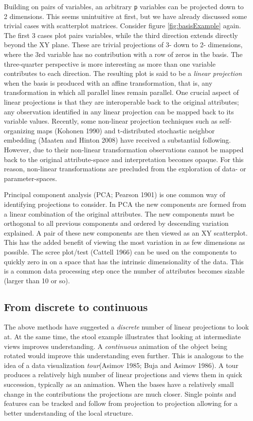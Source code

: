 \documentclass[11,]{article}
\theoremstyle{definition}
\theoremstyle{definition}
\theoremstyle{definition}
\theoremstyle{remark}
\begin{document}
Building on pairs of variables, an arbitrary \texttt{p} variables can be
projected down to 2 dimensions. This seems unintuitive at first, but we
have already discussed some trivial cases with scatterplot matrices.
Consider figure \ref{fig:basisExample} again. The first 3 cases plot
pairs variables, while the third direction extends directly beyond the
XY plane. These are trivial projections of 3- down to 2- dimensions,
where the 3rd variable has no contribution with a row of zeros in the
basis. The three-quarter perspective is more interesting as more than
one variable contributes to each direction. The resulting plot is said
to be a \emph{linear projection} when the basis is produced with an
affine transformation, that is, any transformation in which all parallel
lines remain parallel. One crucial aspect of linear projections is that
they are interoperable back to the original attributes; any observation
identified in any linear projection can be mapped back to its variable
values. Recently, some non-linear projection techniques such as
self-organizing maps (Kohonen 1990) and t-distributed stochastic
neighbor embedding (Maaten and Hinton 2008) have received a substantial
following. However, due to their non-linear transformation observations
cannot be mapped back to the original attribute-space and interpretation
becomes opaque. For this reason, non-linear transformations are
precluded from the exploration of data- or parameter-spaces.

Principal component analysis (PCA; Pearson 1901) is one common way of
identifying projections to consider. In PCA the new components are
formed from a linear combination of the original attributes. The new
components must be orthogonal to all previous components and ordered by
descending variation explained. A pair of these new components are then
viewed as an XY scatterplot. This has the added benefit of viewing the
most variation in as few dimensions as possible. The scree plot/test
(Cattell 1966) can be used on the components to quickly zero in on a
space that has the intrinsic dimensionality of the data. This is a
common data processing step once the number of attributes becomes
sizable (larger than 10 or so).

\subsection{From discrete to
continuous}\label{from-discrete-to-continuous}

The above methods have suggested a \emph{discrete} number of linear
projections to look at. At the same time, the stool example illustrates
that looking at intermediate views improves understanding. A
\emph{continuous} animation of the object being rotated would improve
this understanding even further. This is analogous to the idea of a data
visualization \emph{tour}(Asimov 1985; Buja and Asimov 1986). A tour
produces a relatively high number of linear projections and views them
in quick succession, typically as an animation. When the bases have a
relatively small change in the contributions the projections are much
closer. Single points and features can be tracked and follow from
projection to projection allowing for a better understanding of the
local structure.
\end{document}
